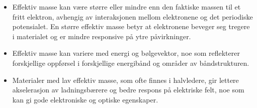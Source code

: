 \begin{itemize}
    \item Effektiv masse kan være større eller mindre enn den faktiske massen til et fritt elektron, avhengig av interaksjonen mellom elektronene og det periodiske potensialet. En større effektiv masse betyr at elektronene beveger seg tregere i materialet og er mindre responsive på ytre påvirkninger.
    \item Effektiv masse kan variere med energi og bølgevektor, noe som reflekterer forskjellige oppførsel i forskjellige energibånd og områder av båndstrukturen.
    \item Materialer med lav effektiv masse, som ofte finnes i halvledere, gir lettere akselerasjon av ladningsbærere og bedre respons på elektriske felt, noe som kan gi gode elektroniske og optiske egenskaper.
\end{itemize}

